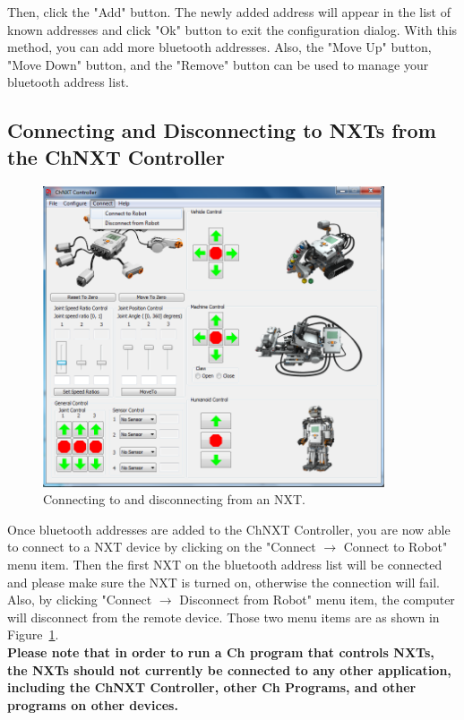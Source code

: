 \documentclass[11pt]{article}
\begin{document}
Then, click the "Add" button. The newly added address will appear in the list of known addresses and click "Ok" button to exit 
the configuration dialog. With this method, you can add more bluetooth addresses. Also, the "Move Up" button, "Move Down" 
button, and the "Remove" button can be used to manage your bluetooth address list.

\subsection{Connecting and Disconnecting to NXTs from the ChNXT Controller}
\begin{figure}[!h]
  \begin{center}
    \includegraphics[height=3.5in]{figure/configuration/menuConnect.png}
    \caption{Connecting to and disconnecting from an NXT.\label{fig:menu_connect}}
  \end{center}
\end{figure}

Once bluetooth addresses are added to the ChNXT Controller, you are now able to connect to a NXT device by clicking on the 
"Connect $\rightarrow$ Connect to Robot" menu item. Then the first NXT on the bluetooth address list will be connected and please make
sure the NXT is turned on, otherwise the connection will fail. Also, by clicking "Connect $\rightarrow$ Disconnect from Robot" menu 
item, the computer will disconnect from the remote device. Those two menu items are as shown in Figure~\ref{fig:menu_connect}.\\

{\bf
Please note that in order to run a Ch program that controls NXTs, the NXTs should not currently be connected to any other
application, including the ChNXT Controller, other Ch Programs, and other programs on other devices.
}\\
\end{document}
